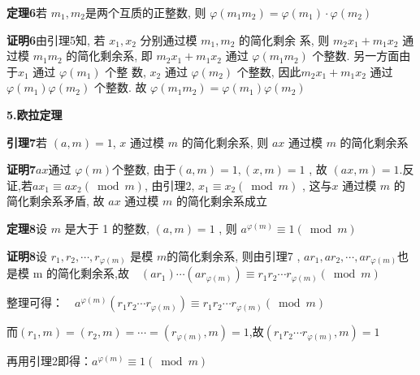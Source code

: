 \documentclass[a4paper,12pt]{article}
\begin{document}
\textbf{定理6}\quad 若 $ m_{1}, m_{2}  $是两个互质的正整数, 则 $ \varphi\left(m_{1} m_{2}\right)=   \varphi\left(m_{1}\right) \cdot \varphi\left(m_{2}\right)$\par
\textbf{证明6}\quad 由引理5知, 若  $x_{1}, x_{2} $ 分别通过模  $m_{1}, m_{2} $ 的简化剩余 系, 则 $ m_{2} x_{1}+m_{1} x_{2} $ 通过模 $ m_{1} m_{2}$  的简化剩余系, 即 $ m_{2} x_{1}+   m_{1} x_{2}$  通过 $ \varphi\left(m_{1} m_{2}\right)$  个整数. 另一方面由于$  x_{1} $ 通过 $ \varphi\left(m_{1}\right) $ 个整 数, $ x_{2} $ 通过 $ \varphi\left(m_{2}\right) $ 个整数, 因此$  m_{2} x_{1}+m_{1} x_{2} $ 通过 $ \varphi\left(m_{1}\right) \varphi\left(m_{2}\right) $ 个整数. 故 $ \varphi\left(m_{1} m_{2}\right)=\varphi\left(m_{1}\right) \varphi\left(m_{2}\right)$ \par 
\quad  \par 



\textbf{5.欧拉定理}\par

\textbf{引理7}\quad 若 $(a, m)=1$, $x$  通过模 $ m $ 的简化剩余系, 则 $ a x $ 通过模 $ m $ 的简化剩余系\par 
\textbf{证明7}\quad $a x  $通过  $\varphi(m)  $个整数, 由于$  (a, m)=1,(x, m)=1$ , 故 $ (a x, m)=1 $.反证,若$  a x_{1} \equiv a x_{2}(\bmod m) $, 由引理2, $ x_{1} \equiv   x_{2}(\bmod m)$ , 这与$x$  通过模 $ m $ 的简化剩余系矛盾, 故 $ a x $ 通过模 $ m $ 的简化剩余系成立\par  

\textbf{定理8}\quad 设 $ m $ 是大于 1 的整数, $ (a, m)=1$ , 则 $ a^{\varphi(m)} \equiv 1(\bmod m)$\par 
\textbf{证明8}\quad 设 $ r_{1}, r_{2}, \cdots, r_{\varphi(m)} $ 是模 $ m  $的简化剩余系, 则由引理7 , $ a r_{1}, a r_{2}, \cdots, a r_{\varphi(m)}  $也是模  m  的简化剩余系,故$\quad\left(a r_{1}\right) \cdots\left(a r_{\varphi(m)}\right) \equiv r_{1}r_{2} \cdots r_{\varphi(m)}(\bmod m)$\par 
整理可得：$\quad a^{\varphi(m)}\left(r_{1} r_{2} \cdots r_{\varphi(m)}\right) \equiv r_{1} r_{2} \cdots r_{\varphi(m)}(\bmod m)$\par 
而$\left(r_{1}, m\right)=\left(r_{2}, m\right)=\cdots=\left(r_{\varphi(m)}, m\right)=1$,故$\left(r_{1} r_{2} \cdots r_{\varphi(m)}, m\right) =1$\par 
再用引理2即得：$ a^{\varphi(m)} \equiv 1(\bmod m)$\par
\quad  \par 
\end{document}
